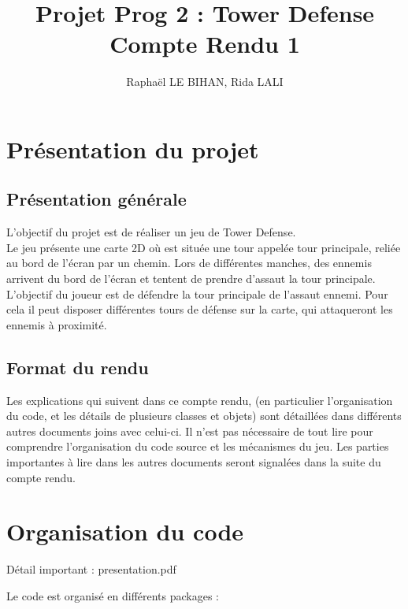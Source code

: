 \documentclass{article}
\title{
  Projet Prog 2 : Tower Defense\\
  \large Compte Rendu 1
}
\author{Raphaël LE BIHAN, Rida LALI}
\begin{document}
\maketitle

\section{Présentation du projet}

\subsection{Présentation générale}

L'objectif du projet est de réaliser un jeu de Tower Defense.\\
Le jeu présente une carte 2D où est située une tour appelée tour principale, reliée au bord de l'écran par un chemin. Lors de différentes manches, des ennemis arrivent du bord de l'écran et tentent de prendre d'assaut la tour principale.\\
L'objectif du joueur est de défendre la tour principale de l'assaut ennemi. Pour cela il peut disposer différentes tours de défense sur la carte, qui attaqueront les ennemis à proximité.

\subsection{Format du rendu}

Les explications qui suivent dans ce compte rendu, (en particulier l'organisation du code, et les détails de plusieurs classes et objets) sont détaillées dans différents autres documents joins avec celui-ci.
Il n'est pas nécessaire de tout lire pour comprendre l'organisation du code source et les mécanismes du jeu.
Les parties importantes à lire dans les autres documents seront signalées dans la suite du compte rendu.

\section{Organisation du code}

Détail important : presentation.pdf

Le code est organisé en différents packages :
\end{document}
